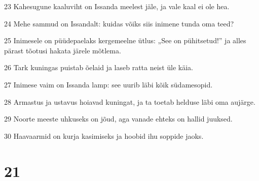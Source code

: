 \par 23 Kahesugune kaaluviht on Issanda meelest jäle, ja vale kaal ei ole hea.
\par 24 Mehe sammud on Issandalt: kuidas võiks siis inimene tunda oma teed?
\par 25 Inimesele on püüdepaelaks kergemeelne ütlus: „See on pühitsetud!” ja alles pärast tõotusi hakata järele mõtlema.
\par 26 Tark kuningas puistab õelaid ja laseb ratta neist üle käia.
\par 27 Inimese vaim on Issanda lamp: see uurib läbi kõik südamesopid.
\par 28 Armastus ja ustavus hoiavad kuningat, ja ta toetab helduse läbi oma aujärge.
\par 29 Noorte meeste uhkuseks on jõud, aga vanade ehteks on hallid juuksed.
\par 30 Haavaarmid on kurja kasimiseks ja hoobid ihu soppide jaoks.

\chapter{21}

